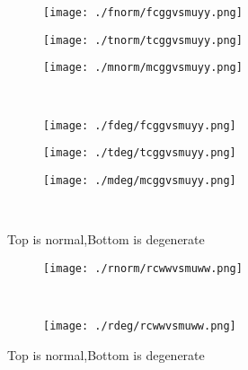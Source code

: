 \documentclass[aps,floats,floatfix,nofootinbib]{revtex4-1}
\begin{document}
\begin{center}
\begin{figure}
\begin{subfigure}{0.3\textwidth}
\texttt{[image: ./fnorm/fcggvsmuyy.png]}
\label{}
\end{subfigure}
\begin{subfigure}{0.3\textwidth}
\texttt{[image: ./tnorm/tcggvsmuyy.png]}
\label{}
\end{subfigure}
\begin{subfigure}{0.3\textwidth}
\texttt{[image: ./mnorm/mcggvsmuyy.png]}
\label{}
\end{subfigure}\\
\begin{subfigure}{0.3\textwidth}
\texttt{[image: ./fdeg/fcggvsmuyy.png]}
\label{}
\end{subfigure}
\begin{subfigure}{0.3\textwidth}
\texttt{[image: ./tdeg/tcggvsmuyy.png]}
\label{}
\end{subfigure}
\begin{subfigure}{0.3\textwidth}
\texttt{[image: ./mdeg/mcggvsmuyy.png]}
\label{}
\end{subfigure}\\
\caption{Top is normal,Bottom is degenerate}
\end{figure}
\end{center}

\begin{center}
\begin{figure}
\begin{subfigure}{1.0\textwidth}
\texttt{[image: ./rnorm/rcwwvsmuww.png]}
\label{}
\end{subfigure}\\
\begin{subfigure}{1.0\textwidth}
\texttt{[image: ./rdeg/rcwwvsmuww.png]}
\label{}
\end{subfigure}
\caption{Top is normal,Bottom is degenerate}
\end{figure}
\end{center}
\end{document}
